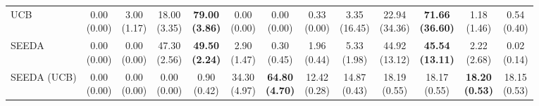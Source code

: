 \begin{table}[H]
{\begin{tabular}{l|cccccc|cccccc}
UCB & \makecell{0.00 \\ (0.00)} & \makecell{3.00 \\ (1.17)} & {\cellcolor[HTML]{C8E6C9}} \makecell{18.00 \\ (3.35)} & \bfseries \makecell{79.00 \\ (3.86)} & \makecell{0.00 \\ (0.00)} & \makecell{0.00 \\ (0.00)} & \makecell{0.33 \\ (0.00)} & \makecell{3.35 \\ (16.45)} & {\cellcolor[HTML]{C8E6C9}} \makecell{22.94 \\ (34.36)} & \bfseries \makecell{71.66 \\ (36.60)} & \makecell{1.18 \\ (1.46)} & \makecell{0.54 \\ (0.40)} \\
SEEDA & \makecell{0.00 \\ (0.00)} & \makecell{0.00 \\ (0.00)} & {\cellcolor[HTML]{C8E6C9}} \makecell{47.30 \\ (2.56)} & \bfseries \makecell{49.50 \\ (2.24)} & \makecell{2.90 \\ (1.47)} & \makecell{0.30 \\ (0.45)} & \makecell{1.96 \\ (0.44)} & \makecell{5.33 \\ (1.98)} & {\cellcolor[HTML]{C8E6C9}} \makecell{44.92 \\ (13.12)} & \bfseries \makecell{45.54 \\ (13.11)} & \makecell{2.22 \\ (2.68)} & \makecell{0.02 \\ (0.14)} \\
SEEDA (UCB) & \makecell{0.00 \\ (0.00)} & \makecell{0.00 \\ (0.00)} & {\cellcolor[HTML]{C8E6C9}} \makecell{0.00 \\ (0.00)} & \makecell{0.90 \\ (0.42)} & \makecell{34.30 \\ (4.97)} & \bfseries \makecell{64.80 \\ (4.70)} & \makecell{12.42 \\ (0.28)} & \makecell{14.87 \\ (0.43)} & {\cellcolor[HTML]{C8E6C9}} \makecell{18.19 \\ (0.55)} & \makecell{18.17 \\ (0.55)} & \bfseries \makecell{18.20 \\ (0.53)} & \makecell{18.15 \\ (0.53)} \\

\end{tabular}}
\end{table}
